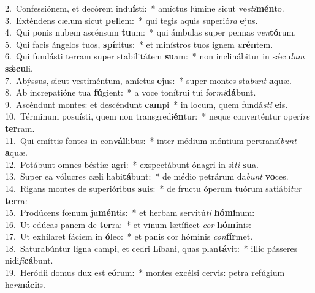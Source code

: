 {2.~}Confessiónem, et decórem indu\textbf{í}sti:~* amíctus lúmine sicut ve\textit{sti}\textbf{mén}to.\\
{3.~}Exténdens cælum sicut \textbf{pel}lem:~* qui tegis aquis superió\textit{ra} \textbf{e}jus.\\
{4.~}Qui ponis nubem ascénsum \textbf{tu}um:~* qui ámbulas super pennas \textit{ven}\textbf{tó}rum.\\
{5.~}Qui facis ángelos tuos, \textbf{spí}ritus:~* et minístros tuos ignem \textit{u}\textbf{rén}tem.\\
{6.~}Qui fundásti terram super stabilitátem \textbf{su}am:~* non inclinábitur in sǽcu\textit{lum} \textbf{sǽ}\textbf{cu}li.\\
{7.~}Abýssus, sicut vestiméntum, amíctus \textbf{e}jus:~* super montes sta\textit{bunt} \textbf{a}quæ.\\
{8.~}Ab increpatióne tua \textbf{fú}gient:~* a voce tonítrui tui for\textit{mi}\textbf{dá}bunt.\\
{9.~}Ascéndunt montes: et descéndunt \textbf{cam}pi~* in locum, quem fundá\textit{sti} \textbf{e}is.\\
{10.~}Términum posuísti, quem non transgredi\textbf{én}tur:~* neque converténtur operí\textit{re} \textbf{ter}ram.\\
{11.~}Qui emíttis fontes in con\textbf{vál}libus:~* inter médium móntium pertransí\textit{bunt} \textbf{a}quæ.\\
{12.~}Potábunt omnes béstiæ \textbf{a}gri:~* exspectábunt ónagri in si\textit{ti} \textbf{su}a.\\
{13.~}Super ea vólucres cæli habi\textbf{tá}bunt:~* de médio petrárum da\textit{bunt} \textbf{vo}ces.\\
{14.~}Rigans montes de superióribus \textbf{su}is:~* de fructu óperum tuórum satiábi\textit{tur} \textbf{ter}ra:\\
{15.~}Prodúcens fœnum ju\textbf{mén}tis:~* et herbam servitú\textit{ti} \textbf{hó}\textbf{mi}num:\\
{16.~}Ut edúcas panem de \textbf{ter}ra:~* et vinum lætíficet \textit{cor} \textbf{hó}\textbf{mi}nis:\\
{17.~}Ut exhílaret fáciem in \textbf{ó}leo:~* et panis cor hóminis \textit{con}\textbf{fír}met.\\
{18.~}Saturabúntur ligna campi, et cedri Líbani, quas plan\textbf{tá}vit:~* illic pásseres nidi\textit{fi}\textbf{cá}bunt.\\
{19.~}Heródii domus dux est e\textbf{ó}rum:~* montes excélsi cervis: petra refúgium he\textit{ri}\textbf{ná}\textbf{ci}is.\\
